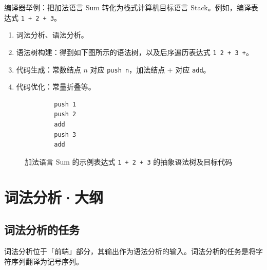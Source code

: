 \documentclass[UTF8]{ctexart}
\newcommand\Emph[1]{\textcolor{cyan!80!black}{#1}}
\begin{document}
编译器举例：把加法语言 Sum 转化为栈式计算机目标语言 Stack。例如，编译表达式 \verb!1 + 2 + 3!。
\begin{enumerate}[itemsep=0pt, parsep=0pt, leftmargin=1.5cm]
  \item 词法分析、语法分析。
  \item 语法树构建：得到如下图所示的语法树，以及后序遍历表达式 \verb!1 2 + 3 +!。
  \item 代码生成：常数结点 $n$ 对应 \verb!push n!，加法结点 $+$ 对应 \verb!add!。
  \item 代码优化：常量折叠等。
\end{enumerate}
\begin{figure}[htb]

    \begin{minipage}[t]{.6\textwidth}
    \vspace{0pt}
    \centering
    \end{minipage}
    \begin{minipage}[t]{.39\textwidth}
    \vspace{0pt}\centering
    \begin{verbatim}
        push 1
        push 2
        add
        push 3
        add
    \end{verbatim}
    \end{minipage}
  \caption{加法语言 Sum 的示例表达式 \texttt{1 + 2 + 3} 的抽象语法树及目标代码}\label{fig:tree-1+2+3}
\end{figure}



\section{词法分析·大纲}
\subsection{词法分析的任务}
词法分析位于「前端」部分，其输出作为语法分析的输入。词法分析的任务是将\Emph{字符序列}翻译为\Emph{记号序列}。
\end{document}
